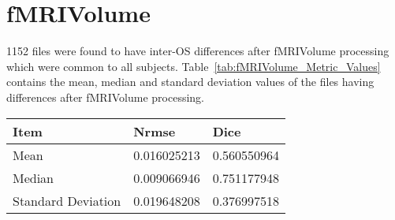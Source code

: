 \section{fMRIVolume}\label{sec:fMRI}
1152 files were found to have inter-OS differences after fMRIVolume processing which were common to all subjects. Table~\ref{tab:fMRIVolume_Metric_Values} contains the mean, median and standard deviation values of the files having differences after fMRIVolume processing.
\hfill \break
\begin{center}
\begin{tabular}{|l|l|l|}
\hline
\textbf{Item}      & \textbf{Nrmse}  & \textbf{Dice} \\ \hline
Mean               & 0.016025213     & 0.560550964   \\ \hline
Median             & 0.009066946     & 0.751177948   \\ \hline
Standard Deviation & 0.019648208     & 0.376997518   \\ \hline
\end{tabular}
\label{tab:fMRIVolume_Metric_Values}
\end{center}
\hfill \break

